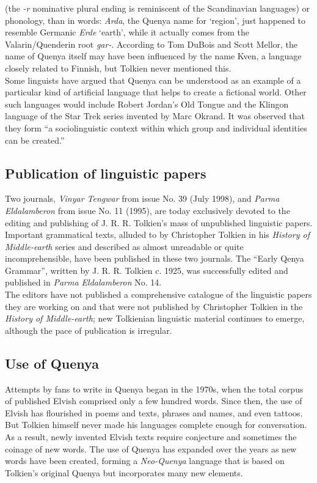 \documentclass[pub]{apa6}
\begin{document}
(the {\it -r} nominative plural ending is reminiscent of the Scandinavian languages) or phonology, than in words: {\it Arda}, the Quenya name for `region', just happened to resemble Germanic {\it Erde} `earth', while it actually comes from the Valarin/Quenderin root {\it gar-}. According to Tom DuBois and Scott Mellor, the name of Quenya itself may have been influenced by the name Kven, a language closely related to Finnish, but Tolkien never mentioned this.\\
\indent Some linguists have argued that Quenya can be understood as an example of a particular kind of artificial language that helps to create a fictional world. Other such languages would include Robert Jordan's Old Tongue and the Klingon language of the Star Trek series invented by Marc Okrand. It was observed that they form ``a sociolinguistic context within which group and individual identities can be created.''

\subsection{Publication of linguistic papers}
Two journals, {\it Vinyar Tengwar} from issue No. 39 (July 1998), and {\it Parma Eldalamberon} from issue No. 11 (1995), are today exclusively devoted to the editing and publishing of J. R. R. Tolkien's mass of unpublished linguistic papers. Important grammatical texts, alluded to by Christopher Tolkien in his {\it History of Middle-earth} series and described as almost unreadable or quite incomprehensible, have been published in these two journals. The ``Early Qenya Grammar'', written by J. R. R. Tolkien c. 1925, was successfully edited and published in {\it Parma Eldalamberon} No. 14.\\
\indent The editors have not published a comprehensive catalogue of the linguistic papers they are working on and that were not published by Christopher Tolkien in the {\it History of Middle-earth}; new Tolkienian linguistic material continues to emerge, although the pace of publication is irregular.

\subsection{Use of Quenya}
Attempts by fans to write in Quenya began in the 1970s, when the total corpus of published Elvish comprised only a few hundred words. Since then, the use of Elvish has flourished in poems and texts, phrases and names, and even tattoos. But Tolkien himself never made his languages complete enough for conversation. As a result, newly invented Elvish texts require conjecture and sometimes the coinage of new words. The use of Quenya has
expanded over the years as new words have been created, forming a {\it Neo-Quenya} language that is based on Tolkien's original Quenya but incorporates many new elements.
\end{document}
